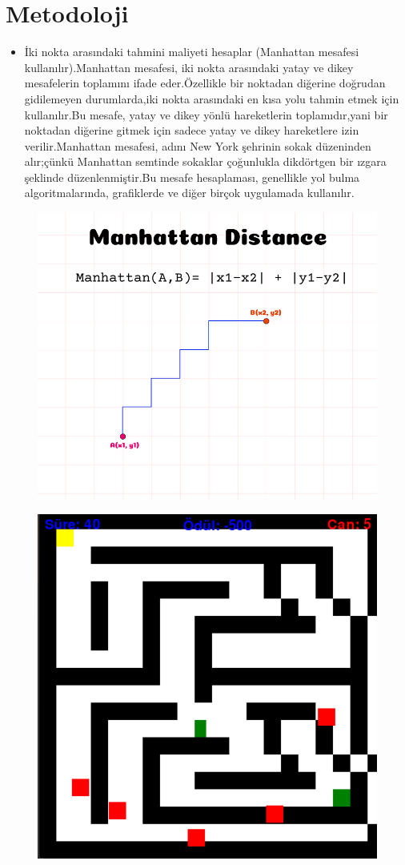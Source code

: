 \documentclass[12pt, a4paper]{article}
\begin{document}
	\section{Metodoloji} 
\begin{landscape} 
	\begin{itemize}
\item	İki nokta arasındaki tahmini maliyeti hesaplar (Manhattan mesafesi kullanılır).Manhattan mesafesi, iki nokta arasındaki yatay ve dikey mesafelerin toplamını ifade eder.Özellikle bir noktadan diğerine doğrudan gidilemeyen durumlarda,iki nokta arasındaki en kısa yolu tahmin etmek için kullanılır.Bu mesafe, yatay ve dikey yönlü hareketlerin toplamıdır,yani bir noktadan diğerine gitmek için sadece yatay ve dikey hareketlere izin verilir.Manhattan mesafesi, adını New York şehrinin sokak düzeninden alır;çünkü Manhattan semtinde sokaklar çoğunlukla dikdörtgen bir ızgara şeklinde düzenlenmiştir.Bu mesafe hesaplaması, genellikle yol bulma algoritmalarında, grafiklerde ve diğer birçok uygulamada kullanılır.		
	
\end{itemize}
	\begin{figure}[!ht]		
		\caption[]{}
		\centering
		
		\includegraphics[height= 5 cm]{manhattan.png}

		\label{}	

		
	\end{figure}
\end{landscape}	



\begin{landscape}
	\begin{figure}[!ht]		
		\caption[]{}
		\centering
			
		\includegraphics[height= 5 cm]{son.png}
		\label{}	
			
		
	\end{figure}
\end{landscape}	
	
\end{document}
